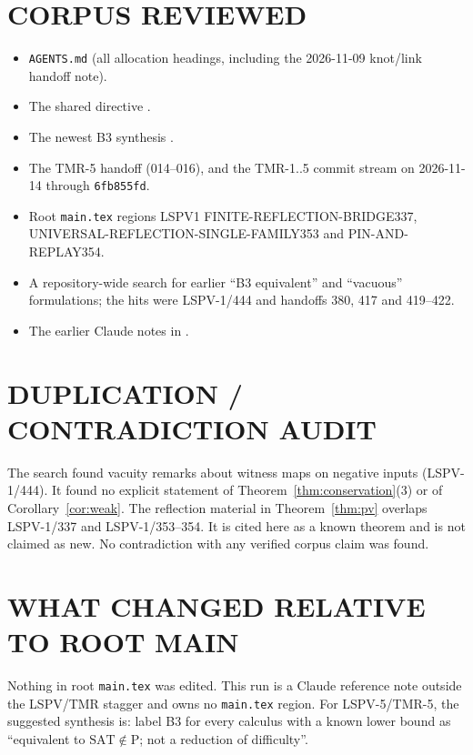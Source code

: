 \documentclass[11pt]{article}
\theoremstyle{definition}
\begin{document}
\section*{CORPUS REVIEWED}
\begin{itemize}
\item \texttt{AGENTS.md} (all allocation headings, including the 2026-11-09 knot/link handoff note).
\item The shared directive .
\item The newest B3 synthesis .
\item The TMR-5 handoff (014--016), and the TMR-1..5 commit stream on 2026-11-14 through \texttt{6fb855fd}.
\item Root \texttt{main.tex} regions LSPV1 FINITE-REFLECTION-BRIDGE337, UNIVERSAL-REFLECTION-SINGLE-FAMILY353 and PIN-AND-REPLAY354.
\item A repository-wide search for earlier ``B3 equivalent'' and ``vacuous'' formulations; the hits were LSPV-1/444 and handoffs 380, 417 and 419--422.
\item The earlier Claude notes in .
\end{itemize}

\section*{DUPLICATION / CONTRADICTION AUDIT}
The search found vacuity remarks about witness maps on negative inputs (LSPV-1/444).
It found no explicit statement of Theorem~\ref{thm:conservation}(3) or of Corollary~\ref{cor:weak}.
The reflection material in Theorem~\ref{thm:pv} overlaps LSPV-1/337 and LSPV-1/353--354.
It is cited here as a known theorem and is not claimed as new.
No contradiction with any verified corpus claim was found.

\section*{WHAT CHANGED RELATIVE TO ROOT MAIN}
Nothing in root \texttt{main.tex} was edited.
This run is a Claude reference note outside the LSPV/TMR stagger and owns no \texttt{main.tex} region.
For LSPV-5/TMR-5, the suggested synthesis is: label B3 for every calculus with a known lower bound as ``equivalent to $\mathrm{SAT}\notin\mathrm{P}$; not a reduction of difficulty''.
\end{document}
